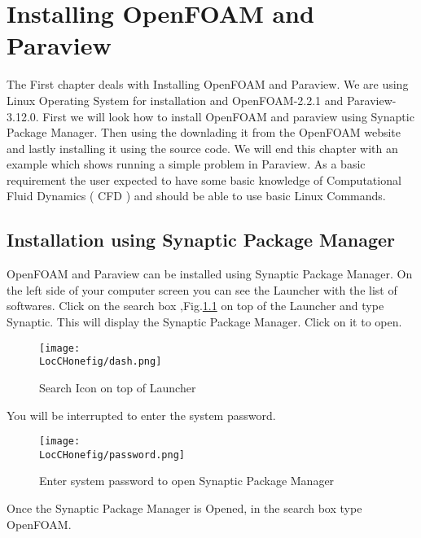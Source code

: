 \chapter{Installing OpenFOAM and Paraview}
\thispagestyle{empty}
\label{sec:chap1}
\newcommand{\LocCHonefig}{\Origin/CHAPTERS/chap1/figures}

The First chapter deals with Installing OpenFOAM and Paraview. We are using Linux Operating System for installation and OpenFOAM-2.2.1 and Paraview-3.12.0.
First we will look how to install OpenFOAM and paraview using Synaptic Package Manager. Then using the downlading it from the OpenFOAM website and lastly installing
it using the source code. We will end this chapter with an example which shows running a simple problem in Paraview. As a basic requirement the user expected to have 
some basic knowledge of Computational Fluid Dynamics ( CFD ) and should be able to use basic Linux Commands.

\section{Installation using Synaptic Package Manager}

OpenFOAM and Paraview can be installed using Synaptic Package Manager. On the left side of your computer screen you can see the Launcher with the list of softwares.
Click on the search box ,Fig.\ref{search} on top of the Launcher and type Synaptic. This will display the Synaptic Package Manager. Click on it to open.

\begin{figure}[h]  
\begin{center}  
\texttt{[image: \\LocCHonefig/dash.png]}
\caption{Search Icon on top of Launcher}
\label{search}
\end{center}  
\end{figure}

\flushleft You will be interrupted to enter the system password.

\begin{figure}[h]  
\begin{center}  
\texttt{[image: \\LocCHonefig/password.png]}
\caption{Enter system password to open Synaptic Package Manager}
\end{center}  
\end{figure}
\vspace{1cm}

\flushleft Once the Synaptic Package Manager is Opened, in the search box type OpenFOAM.

